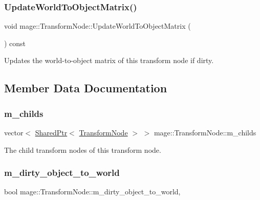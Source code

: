 \subsubsection{\texorpdfstring{Update\+World\+To\+Object\+Matrix()}{UpdateWorldToObjectMatrix()}}
{\footnotesize\ttfamily void mage\+::\+Transform\+Node\+::\+Update\+World\+To\+Object\+Matrix (\begin{DoxyParamCaption}{ }\end{DoxyParamCaption}) const\hspace{0.3cm}{\ttfamily [private]}}

Updates the world-\/to-\/object matrix of this transform node if dirty. 

\subsection{Member Data Documentation}
\hypertarget{classmage_1_1_transform_node_a195ffa4b40a7055bad41c1fec83e0dc0}{}\label{classmage_1_1_transform_node_a195ffa4b40a7055bad41c1fec83e0dc0} 
\subsubsection{\texorpdfstring{m\+\_\+childs}{m\_childs}}
{\footnotesize\ttfamily vector$<$ \hyperlink{namespacemage_a1e01ae66713838a7a67d30e44c67703e}{Shared\+Ptr}$<$ \hyperlink{classmage_1_1_transform_node}{Transform\+Node} $>$ $>$ mage\+::\+Transform\+Node\+::m\+\_\+childs\hspace{0.3cm}{\ttfamily [private]}}

The child transform nodes of this transform node. \hypertarget{classmage_1_1_transform_node_a389151fddc72499d0be4e725622d99b9}{}\label{classmage_1_1_transform_node_a389151fddc72499d0be4e725622d99b9} 
\subsubsection{\texorpdfstring{m\+\_\+dirty\+\_\+object\+\_\+to\+\_\+world}{m\_dirty\_object\_to\_world}}
{\footnotesize\ttfamily bool mage\+::\+Transform\+Node\+::m\+\_\+dirty\+\_\+object\+\_\+to\+\_\+world\hspace{0.3cm}{\ttfamily [mutable]}, {\ttfamily [private]}}

